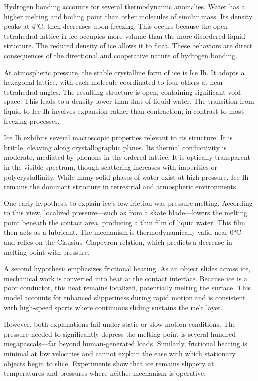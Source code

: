 Hydrogen bonding accounts for several thermodynamic anomalies. Water has a higher melting and boiling point than other molecules of similar mass. Its density peaks at 4°C, then decreases upon freezing. This occurs because the open tetrahedral lattice in ice occupies more volume than the more disordered liquid structure. The reduced density of ice allows it to float. These behaviors are direct consequences of the directional and cooperative nature of hydrogen bonding.

At atmospheric pressure, the stable crystalline form of ice is Ice Ih. It adopts a hexagonal lattice, with each molecule coordinated to four others at near-tetrahedral angles. The resulting structure is open, containing significant void space. This leads to a density lower than that of liquid water. The transition from liquid to Ice Ih involves expansion rather than contraction, in contrast to most freezing processes.

Ice Ih exhibits several macroscopic properties relevant to its structure. It is brittle, cleaving along crystallographic planes. Its thermal conductivity is moderate, mediated by phonons in the ordered lattice. It is optically transparent in the visible spectrum, though scattering increases with impurities or polycrystallinity. While many solid phases of water exist at high pressure, Ice Ih remains the dominant structure in terrestrial and atmospheric environments.

One early hypothesis to explain ice's low friction was pressure melting. According to this view, localized pressure—such as from a skate blade—lowers the melting point beneath the contact area, producing a thin film of liquid water. This film then acts as a lubricant. The mechanism is thermodynamically valid near 0°C and relies on the Clausius–Clapeyron relation, which predicts a decrease in melting point with pressure.

A second hypothesis emphasizes frictional heating. As an object slides across ice, mechanical work is converted into heat at the contact interface. Because ice is a poor conductor, this heat remains localized, potentially melting the surface. This model accounts for enhanced slipperiness during rapid motion and is consistent with high-speed sports where continuous sliding sustains the melt layer.

However, both explanations fail under static or slow-motion conditions. The pressure needed to significantly depress the melting point is several hundred megapascals—far beyond human-generated loads. Similarly, frictional heating is minimal at low velocities and cannot explain the ease with which stationary objects begin to slide. Experiments show that ice remains slippery at temperatures and pressures where neither mechanism is operative.


